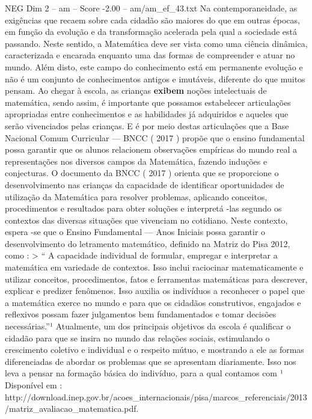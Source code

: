 \begin{textsample}{NEG Dim 2 – am – Score -2.00 – am/am\_ef\_43.txt}  \label{ex:f2_neg_137}
Na contemporaneidade, as exigências que recaem sobre cada cidadão são maiores do que em outras épocas, em função da evolução e da transformação acelerada pela qual a sociedade está passando.
Neste sentido, a Matemática deve ser vista como uma ciência dinâmica, caracterizada e encarada enquanto uma das formas de compreender e atuar no mundo.
Além disto, este campo do conhecimento está em permanente evolução e não é um conjunto de conhecimentos antigos e imutáveis, diferente do que muitos pensam.
Ao chegar à escola, as crianças \textbf{exibem} noções intelectuais de matemática, sendo assim, é importante que possamos estabelecer articulações apropriadas entre conhecimentos e as habilidades já adquiridos e aqueles que serão vivenciados pelas crianças.
E é por meio destas articulações que a Base Nacional Comum Curricular — BNCC ( 2017 ) propõe que o ensino fundamental possa garantir que os alunos relacionem observações empíricas do mundo real a representações nos diversos campos da Matemática, fazendo induções e conjecturas.
O documento da BNCC ( 2017 ) orienta que se proporcione o desenvolvimento nas crianças da capacidade de identificar oportunidades de utilização da Matemática para resolver problemas, aplicando conceitos, procedimentos e resultados para obter soluções e interpretá -las segundo os contextos das diversas situações que vivenciam no cotidiano.
Neste contexto, espera -se que o Ensino Fundamental — Anos Iniciais possa garantir o desenvolvimento do letramento matemático, definido na Matriz do Pisa 2012, como : > “ A capacidade individual de formular, empregar e interpretar a matemática em variedade de contextos.
Isso inclui raciocinar matematicamente e utilizar conceitos, procedimentos, fatos e ferramentas matemáticas para descrever, explicar e predizer fenômenos.
Isso auxilia os indivíduos a reconhecer o papel que a matemática exerce no mundo e para que os cidadãos construtivos, engajados e reflexivos possam fazer julgamentos bem fundamentados e tomar decisões necessárias.”¹ Atualmente, um dos principais objetivos da escola é qualificar o cidadão para que se insira no mundo das relações sociais, estimulando o crescimento coletivo e individual e o respeito mútuo, e mostrando a ele as formas diferenciadas de abordar os problemas que se apresentam diariamente.
Isso nos leva a pensar na formação básica do indivíduo, para a qual contamos com ¹ Disponível em : http://download.inep.gov.br/acoes\_internacionais/pisa/marcos\_referenciais/2013/matriz\_avaliacao\_matematica.pdf.

\end{textsample}

